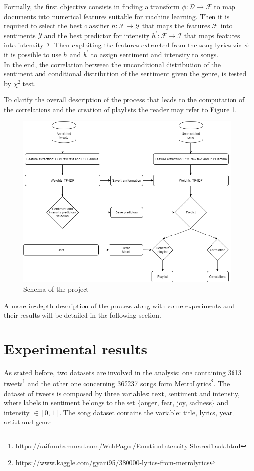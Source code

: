 \documentclass[runningheads]{llncs}
\begin{document}
Formally, the first objective consists in finding a transform $\phi: \mathcal{D} \rightarrow \mathcal{F}$ to map documents into numerical features suitable for machine learning. Then it is required to select the best classifier $h: \mathcal{F} \rightarrow \mathcal{Y}$ that maps the features $\mathcal{F}$ into sentiments $\mathcal{Y}$ and the best predictor for intensity $h^{\prime}: \mathcal{F} \rightarrow \mathcal{I}$ that maps features into intensity $\mathcal{I}$.  Then exploiting the features extracted from the song lyrics via $\phi$ it is possible to use $h$ and $h^{\prime}$ to assign sentiment and intensity to songs. \\
In the end, the correlation between the unconditional distribution of the sentiment and conditional distribution of the sentiment given the genre, is tested by $\chi^2$ test.

To clarify the overall description of the process that leads to the computation of the correlations and the creation of playlists the reader may refer to Figure \ref{fig:schema}.
\begin{figure}[H]
    \centering
    \includegraphics[width=1\textwidth]{images/schema.png}
    \caption{Schema of the project}
    \label{fig:schema}
\end{figure}
A more in-depth description of the process along with some experiments and their results will be detailed in the following section.\\

\section{Experimental results}
As stated before, two datasets are involved in the analysis: one containing 3613 tweets\footnote{https://saifmohammad.com/WebPages/EmotionIntensity-SharedTask.html} and the other one concerning 362237 songs form MetroLyrics\footnote{https://www.kaggle.com/gyani95/380000-lyrics-from-metrolyrics}. The dataset of tweets is composed by three variables: text, sentiment and intensity, where labels in sentiment belongs to the set \{anger, fear, joy, sadness\} and intensity $\in [0,1]$. The song dataset contains the variable: title, lyrics, year, artist and genre. \\
\end{document}
